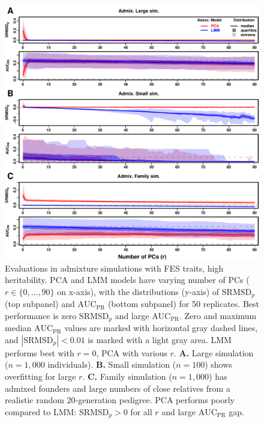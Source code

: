 \documentclass[9pt,lineno]{elife}
\newcommand{\rmsd}{\text{SRMSD}_p}
\newcommand{\auc}{\text{AUC}_\text{PR}}
\begin{document}
\begin{figure}
  \begin{fullwidth}
    \includegraphics[width=\linewidth,height=\textheight,keepaspectratio]{fes/rmsd-auc-sim.pdf}
    \caption{
      Evaluations in admixture simulations with FES traits, high heritability.
      PCA and LMM models have varying number of PCs ($r \in \{0, ..., 90\}$ on x-axis), with the distributions (y-axis) of $\rmsd$ (top subpanel) and $\auc$ (bottom subpanel) for 50 replicates.
      Best performance is zero $\rmsd$ and large $\auc$.
      Zero and maximum median $\auc$ values are marked with horizontal gray dashed lines, and $|\rmsd| < 0.01$ is marked with a light gray area.
      LMM performs best with $r=0$, PCA with various $r$.
      \textbf{A.}
      Large simulation ($n = 1,000$ individuals).
      \textbf{B.}
      Small simulation ($n = 100$) shows overfitting for large $r$.
      \textbf{C.}
      Family simulation ($n = 1,000$) has admixed founders and large numbers of close relatives from a realistic random 20-generation pedigree.
      PCA performs poorly compared to LMM: $\rmsd > 0$ for all $r$ and large $\auc$ gap.
    }
    \label{fig:rmsd-auc-sim}
\end{fullwidth}
\end{figure}
\end{document}
